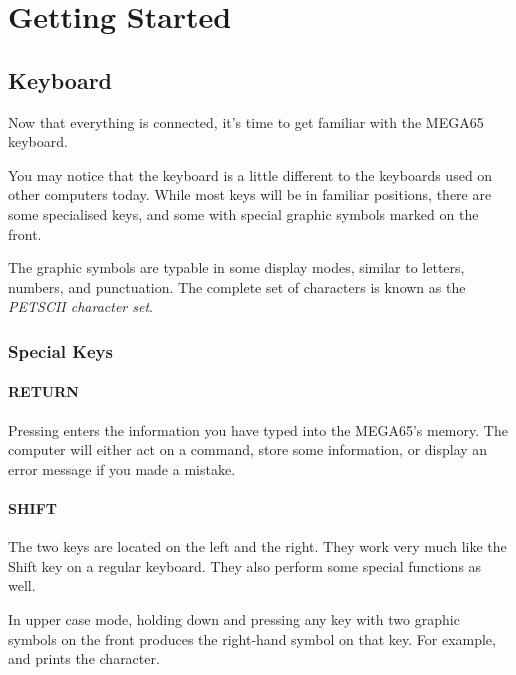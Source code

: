 \chapter{Getting Started}
\hypersetup{bookmarksdepth=5}

\section{Keyboard}
\label{cha:getting-started}

Now that everything is connected, it's time to get familiar with the MEGA65 keyboard.

You may notice that the keyboard is a little different to the keyboards used on other computers today. While most keys will be in familiar positions, there are some specialised keys, and some with special graphic symbols marked on the front.

The graphic symbols are typable in some display modes, similar to letters, numbers, and punctuation. The complete set of characters is known as the {\em PETSCII character set}.

\subsection{Special Keys}

\subsubsection{RETURN}
Pressing  enters the information you have typed into the MEGA65's memory. The computer will either act on a command, store some information, or display an error message if you made a mistake.

\subsubsection{SHIFT}
The two  keys are located on the left and the right. They work very much like the Shift key on a regular keyboard. They also perform some special functions as well.

In upper case mode, holding down  and pressing any key with two graphic symbols on the front produces the right-hand symbol on that key. For example,  and  prints the  character.

